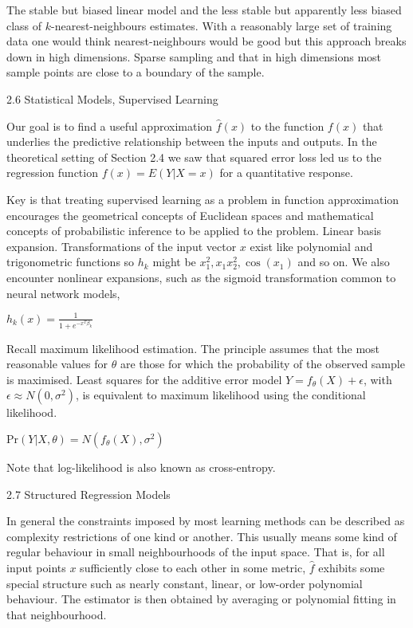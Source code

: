 The stable but biased linear model and the less stable but apparently less biased class of $k$-nearest-neighbours estimates. With a reasonably large set of training data one would think nearest-neighbours would be good but this approach breaks down in high dimensions. Sparse sampling and that in high dimensions most sample points are close to a boundary of the sample.

2.6 Statistical Models, Supervised Learning

Our goal is to find a useful approximation $\hat{f}(x)$ to the function $f(x)$ that underlies the predictive relationship between the inputs and outputs. In the theoretical setting of Section 2.4 we saw that squared error loss led us to the regression function $f(x)=E(Y|X=x)$ for a quantitative response.

Key is that treating supervised learning as a problem in function approximation encourages the geometrical concepts of Euclidean spaces and mathematical concepts of probabilistic inference to be applied to the problem. Linear basis expansion. Transformations of the input vector $x$ exist like polynomial and trigonometric functions so $h_k$ might be $x_1^2,x_1x_2^2,\cos(x_1)$ and so on. We also encounter nonlinear expansions, such as the sigmoid transformation common to neural network models,

$h_k(x) = \frac{1}{1+e^{-x^T \beta_k}}$

Recall maximum likelihood estimation. The principle assumes that the most reasonable values for $\theta$ are those for which the probability of the observed sample is maximised. Least squares for the additive error model $Y=f_{\theta}(X)+\epsilon$, with $\epsilon \approx N(0,\sigma^2)$, is equivalent to maximum likelihood using the conditional likelihood.

$\text{Pr}(Y|X,\theta) = N(f_{\theta}(X),\sigma^2)$

Note that log-likelihood is also known as cross-entropy.

2.7 Structured Regression Models

In general the constraints imposed by most learning methods can be described as complexity restrictions of one kind or another. This usually means some kind of regular behaviour in small neighbourhoods of the input space. That is, for all input points $x$ sufficiently close to each other in some metric, $\hat{f}$ exhibits some special structure such as nearly constant, linear, or low-order polynomial behaviour. The estimator is then obtained by averaging or polynomial fitting in that neighbourhood.

